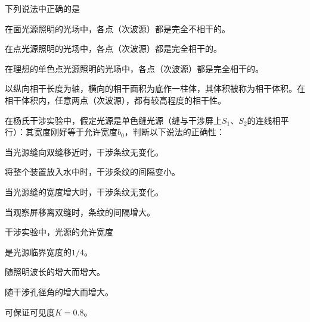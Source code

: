 \documentclass[padl, analysis, notocnum]{ExBook}
\newcommand{\answerarea}[1][3.5cm]{%
  \par\vspace{1mm}%
  \noindent{\color{themeColor!35}\rule{\linewidth}{0.4pt}}\par
  \noindent\begin{minipage}[t][#1][t]{\linewidth}\vspace{0pt}\end{minipage}\par
  \noindent{\color{themeColor!35}\rule{\linewidth}{0.4pt}}\par
}
\begin{document}
\begin{qitems}[startnum=4]
\qitem 下列说法中正确的是
\par\noindent\hspace{2em}在面光源照明的光场中，各点（次波源）都是完全不相干的。
\par\noindent\hspace{2em}在点光源照明的光场中，各点（次波源）都是完全相干的。
\par\noindent\hspace{2em}在理想的单色点光源照明的光场中，各点（次波源）都是完全相干的。
\par\noindent\hspace{2em}以纵向相干长度为轴，横向的相干面积为底作一柱体，其体积被称为相干体积。在相干体积内，任意两点（次波源），都有较高程度的相干性。
\label{q:207:start}
\answerarea[4.0cm]
\label{q:207:end}
\end{qitems}

\begin{qitems}[startnum=5]
\qitem 在杨氏干涉实验中，假定光源是单色缝光源（缝与干涉屏上$S_{1}$、$S_{2}$的连线相平行）：其宽度刚好等于允许宽度$b_{0}$，判断以下说法的正确性：
\par\noindent\hspace{2em}当光源缝向双缝移近时，干涉条纹无变化。
\par\noindent\hspace{2em}将整个装置放入水中时，干涉条纹的间隔变小。
\par\noindent\hspace{2em}当光源缝的宽度增大时，干涉条纹无变化。
\par\noindent\hspace{2em}当观察屏移离双缝时，条纹的间隔增大。
\label{q:208:start}
\answerarea[4.0cm]
\label{q:208:end}
\end{qitems}

\begin{qitems}[startnum=6]
\qitem 干涉实验中，光源的允许宽度
\par\noindent\hspace{2em}是光源临界宽度的$1/4$。
\par\noindent\hspace{2em}随照明波长的增大而增大。
\par\noindent\hspace{2em}随干涉孔径角的增大而增大。
\par\noindent\hspace{2em}可保证可见度$K=0.8$。
\label{q:209:start}
\answerarea[4.0cm]
\label{q:209:end}
\end{qitems}
\end{document}
